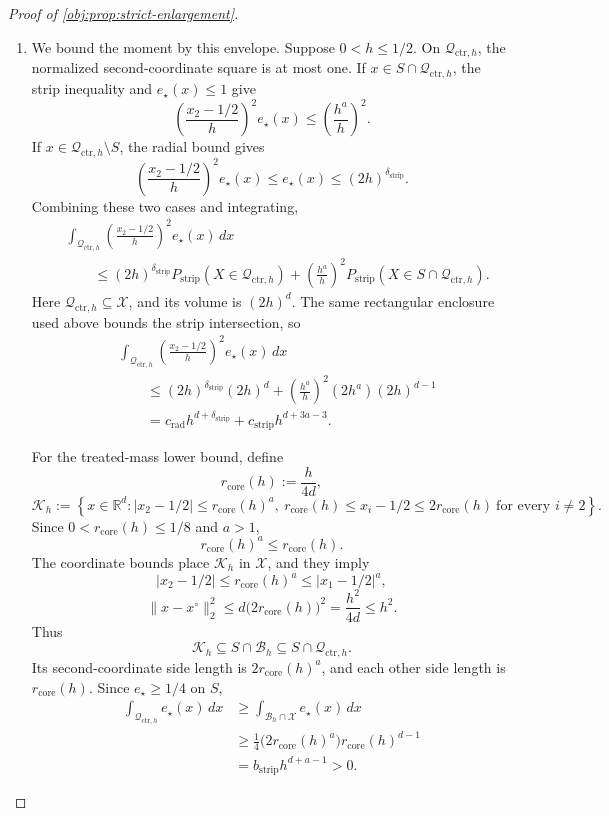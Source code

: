 \begin{proof}[Proof of \cref{obj:prop:strict-enlargement}]
\begin{enumerate}
\item We bound the moment by this envelope. Suppose \(0<h\le1/2\). On \(\mathcal Q_{\mathrm{ctr},h}\), the normalized second-coordinate square is at most one. If \(x\in S\cap\mathcal Q_{\mathrm{ctr},h}\), the strip inequality and \(e_\star(x)\le1\) give
\[
\left(\frac{x_2-1/2}{h}\right)^2e_\star(x)
\le\left(\frac{h^a}{h}\right)^2.
\]
If \(x\in\mathcal Q_{\mathrm{ctr},h}\setminus S\), the radial bound gives
\[
\left(\frac{x_2-1/2}{h}\right)^2e_\star(x)
\le e_\star(x)\le(2h)^{\delta_{\mathrm{strip}}}.
\]
Combining these two cases and integrating,
\[
\begin{aligned}
&\int_{\mathcal Q_{\mathrm{ctr},h}}
\left(\frac{x_2-1/2}{h}\right)^2e_\star(x)\,dx\\
&\qquad\le
(2h)^{\delta_{\mathrm{strip}}}
P_{\mathrm{strip}}(X\in\mathcal Q_{\mathrm{ctr},h})
+
\left(\frac{h^a}{h}\right)^2
P_{\mathrm{strip}}(X\in S\cap\mathcal Q_{\mathrm{ctr},h}).
\end{aligned}
\]
Here \(\mathcal Q_{\mathrm{ctr},h}\subseteq\mathcal X\), and its volume is \((2h)^d\). The same rectangular enclosure used above bounds the strip intersection, so
\[
\begin{aligned}
&\int_{\mathcal Q_{\mathrm{ctr},h}}
\left(\frac{x_2-1/2}{h}\right)^2e_\star(x)\,dx\\
&\qquad\le
(2h)^{\delta_{\mathrm{strip}}}(2h)^d
+\left(\frac{h^a}{h}\right)^2(2h^a)(2h)^{d-1}\\
&\qquad=
c_{\mathrm{rad}}h^{d+\delta_{\mathrm{strip}}}
+c_{\mathrm{strip}}h^{d+3a-3}.
\end{aligned}
\]

For the treated-mass lower bound, define
\[
r_{\mathrm{core}}(h):=\frac{h}{4d},
\]
\[
\mathcal K_h
:=
\left\{
x\in\mathbb R^d:
|x_2-1/2|\le r_{\mathrm{core}}(h)^a,\
r_{\mathrm{core}}(h)\le x_i-1/2\le2r_{\mathrm{core}}(h)
\ \text{for every }i\ne2
\right\}.
\]
Since \(0<r_{\mathrm{core}}(h)\le1/8\) and \(a>1\),
\[
r_{\mathrm{core}}(h)^a\le r_{\mathrm{core}}(h).
\]
The coordinate bounds place \(\mathcal K_h\) in \(\mathcal X\), and they imply
\[
|x_2-1/2|
\le r_{\mathrm{core}}(h)^a
\le |x_1-1/2|^a,
\]
\[
\|x-x^\circ\|_2^2
\le d\bigl(2r_{\mathrm{core}}(h)\bigr)^2
=\frac{h^2}{4d}\le h^2.
\]
Thus
\[
\mathcal K_h\subseteq S\cap\mathcal B_h
\subseteq S\cap\mathcal Q_{\mathrm{ctr},h}.
\]
Its second-coordinate side length is \(2r_{\mathrm{core}}(h)^a\), and each other side length is \(r_{\mathrm{core}}(h)\). Since \(e_\star\ge1/4\) on \(S\),
\[
\begin{aligned}
\int_{\mathcal Q_{\mathrm{ctr},h}}e_\star(x)\,dx
&\ge\int_{\mathcal B_h\cap\mathcal X}e_\star(x)\,dx\\
&\ge\frac14
\bigl(2r_{\mathrm{core}}(h)^a\bigr)
r_{\mathrm{core}}(h)^{d-1}\\
&=b_{\mathrm{strip}}h^{d+a-1}>0.
\end{aligned}
\]


\end{enumerate}
\end{proof}
